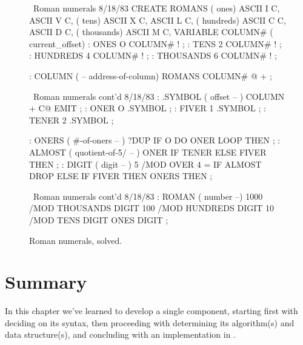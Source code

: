 \begin{figure*}[tttt]
\caption{Roman numerals, solved.}
\vspace{1ex}
\setcounter{screen}{20}
\begin{Screen}
\ Roman numerals                                         8/18/83
CREATE ROMANS    ( ones)  ASCII I  C,   ASCII V  C,
                 ( tens)  ASCII X  C,   ASCII L  C,
             ( hundreds)  ASCII C  C,   ASCII D  C,
            ( thousands)  ASCII M  C,
VARIABLE COLUMN#  ( current_offset)
: ONES       O COLUMN# ! ;
: TENS       2 COLUMN# ! ;
: HUNDREDS   4 COLUMN# ! ;
: THOUSANDS  6 COLUMN# ! ;

: COLUMN ( -- address-of-column)  ROMANS  COLUMN# @  + ;

\end{Screen}

\begin{Screen}
\ Roman numerals cont'd                                  8/18/83
: .SYMBOL  ( offset -- )  COLUMN +  C@ EMIT ;
: ONER    O .SYMBOL ;
: FIVER   1 .SYMBOL ;
: TENER   2 .SYMBOL ;

: ONERS  ( #-of-oners -- )
   ?DUP  IF  O DO  ONER  LOOP  THEN ;
: ALMOST  ( quotient-of-5/ -- )
   ONER  IF  TENER  ELSE  FIVER  THEN ;
: DIGIT  ( digit -- )
   5 /MOD  OVER  4 = IF  ALMOST  DROP  ELSE  IF FIVER THEN
   ONERS THEN ;

\end{Screen}

\begin{Screen}
\ Roman numerals cont'd                                  8/18/83
: ROMAN  ( number --)  1000 /MOD  THOUSANDS DIGIT
                        100 /MOD   HUNDREDS DIGIT
                         10 /MOD       TENS DIGIT
                                       ONES DIGIT  ;

\end{Screen}
\vspace{1ex}
\label{fig-fig4-9}
\end{figure*}%
%

\section{Summary}

In this chapter we've learned to develop a single component, starting
first with deciding on its syntax, then proceeding with determining its
algorithm(s)
and data structure(s), and concluding with an implementation in \Forth{}.

